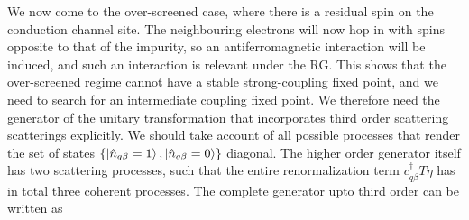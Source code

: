 \documentclass[reprint,prb,superscriptaddress]{revtex4-2}
\begin{document}
We now come to the over-screened case, where there is a residual spin on the conduction channel site. The neighbouring electrons will now hop in with spins opposite to that of the impurity, so an antiferromagnetic interaction will be induced, and such an interaction is relevant under the RG. This shows that the over-screened regime cannot have a stable strong-coupling fixed point, and we need to search for an intermediate coupling fixed point. We therefore need the generator of the unitary transformation that incorporates third order scattering scatterings explicitly. We should take account of all possible processes that render the set of states \(\left\{\ket{\hat n_{q\beta}=1},\ket{\hat n_{q\beta}=0}\right\}\) diagonal. The higher order generator itself has two scattering processes, such that the entire renormalization term \(c^\dagger_{q\beta} T \eta\) has in total three coherent processes. The complete generator upto third order can be written as
\end{document}
